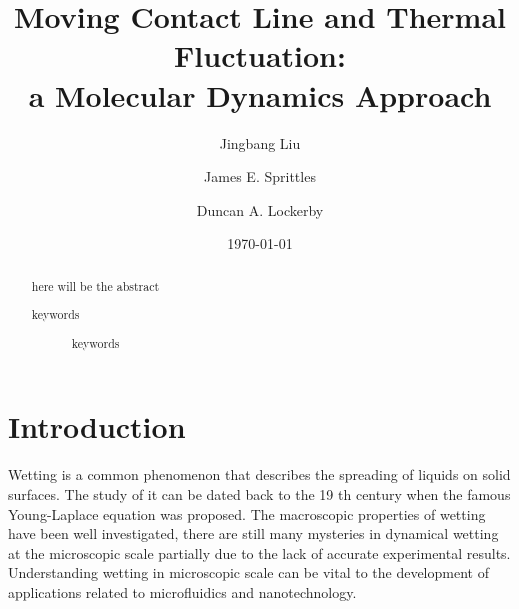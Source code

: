 \documentclass[
reprint,
 amsmath,amssymb,
 aps,
url
]{revtex4-1}
\begin{document}

\title{Moving Contact Line and Thermal Fluctuation: \\a Molecular Dynamics Approach}%


\author{Jingbang Liu}
%


\author{James E. Sprittles}
%

\author{Duncan A. Lockerby}
%


\date{\today}%

\begin{abstract}
here will be the abstract
\begin{description}
\item[keywords]
keywords
\end{description}
\end{abstract}

\maketitle


\section{Introduction}

Wetting is a common phenomenon that describes the spreading of liquids on solid surfaces. The
study of it can be dated back to the 19 th century when the famous Young-Laplace equation was
proposed. The macroscopic properties of wetting have been well investigated, there are still many
mysteries in dynamical wetting at the microscopic scale partially due to the lack of accurate
experimental results. Understanding wetting in microscopic scale can be vital to the development of applications related to microfluidics and nanotechnology.
\end{document}
